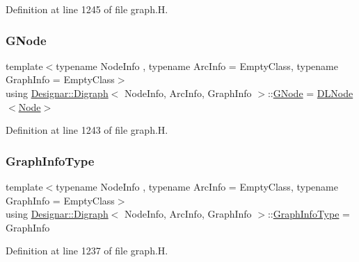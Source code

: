 Definition at line 1245 of file graph.\+H.

\mbox{\label{class_designar_1_1_digraph_a33b0d2b8820ada501522b0e67e63524a}} 
\subsubsection{\texorpdfstring{G\+Node}{GNode}}
{\footnotesize\ttfamily template$<$typename Node\+Info , typename Arc\+Info  = Empty\+Class, typename Graph\+Info  = Empty\+Class$>$ \\
using \hyperlink{class_designar_1_1_digraph}{Designar\+::\+Digraph}$<$ Node\+Info, Arc\+Info, Graph\+Info $>$\+::\hyperlink{class_designar_1_1_digraph_a33b0d2b8820ada501522b0e67e63524a}{G\+Node} =  \hyperlink{class_designar_1_1_d_l_node}{D\+L\+Node}$<$\hyperlink{class_designar_1_1_digraph_a4dc921c41a480b7946a04170e997d8ae}{Node}$>$\hspace{0.3cm}{\ttfamily [protected]}}



Definition at line 1243 of file graph.\+H.

\mbox{\label{class_designar_1_1_digraph_a2baffbb176ff86becd7452d2acc0ca74}} 
\subsubsection{\texorpdfstring{Graph\+Info\+Type}{GraphInfoType}}
{\footnotesize\ttfamily template$<$typename Node\+Info , typename Arc\+Info  = Empty\+Class, typename Graph\+Info  = Empty\+Class$>$ \\
using \hyperlink{class_designar_1_1_digraph}{Designar\+::\+Digraph}$<$ Node\+Info, Arc\+Info, Graph\+Info $>$\+::\hyperlink{class_designar_1_1_digraph_a2baffbb176ff86becd7452d2acc0ca74}{Graph\+Info\+Type} =  Graph\+Info}



Definition at line 1237 of file graph.\+H.

\mbox{\label{class_designar_1_1_digraph_a4dc921c41a480b7946a04170e997d8ae}} 
